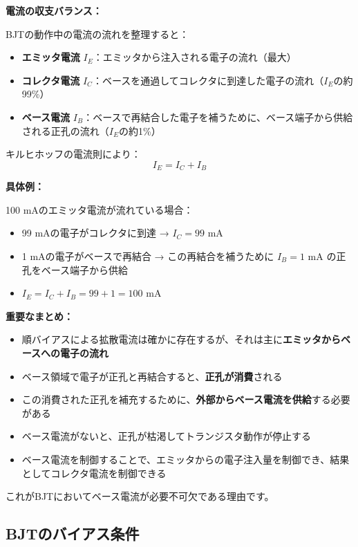 \textbf{電流の収支バランス：}

BJTの動作中の電流の流れを整理すると：

\begin{itemize}
\item \textbf{エミッタ電流} $I_E$：エミッタから注入される電子の流れ（最大）
\item \textbf{コレクタ電流} $I_C$：ベースを通過してコレクタに到達した電子の流れ（$I_E$の約99\%）
\item \textbf{ベース電流} $I_B$：ベースで再結合した電子を補うために、ベース端子から供給される正孔の流れ（$I_E$の約1\%）
\end{itemize}

キルヒホッフの電流則により：
\begin{equation}
I_E = I_C + I_B
\end{equation}

\textbf{具体例：}

100 mAのエミッタ電流が流れている場合：
\begin{itemize}
\item 99 mAの電子がコレクタに到達 → $I_C = 99$ mA
\item 1 mAの電子がベースで再結合 → この再結合を補うために $I_B = 1$ mA の正孔をベース端子から供給
\item $I_E = I_C + I_B = 99 + 1 = 100$ mA
\end{itemize}

\textbf{重要なまとめ：}

\begin{itemize}
\item 順バイアスによる拡散電流は確かに存在するが、それは主に\textbf{エミッタからベースへの電子の流れ}
\item ベース領域で電子が正孔と再結合すると、\textbf{正孔が消費}される
\item この消費された正孔を補充するために、\textbf{外部からベース電流を供給}する必要がある
\item ベース電流がないと、正孔が枯渇してトランジスタ動作が停止する
\item ベース電流を制御することで、エミッタからの電子注入量を制御でき、結果としてコレクタ電流を制御できる
\end{itemize}

これがBJTにおいてベース電流が必要不可欠である理由です。

\subsection{BJTのバイアス条件}

